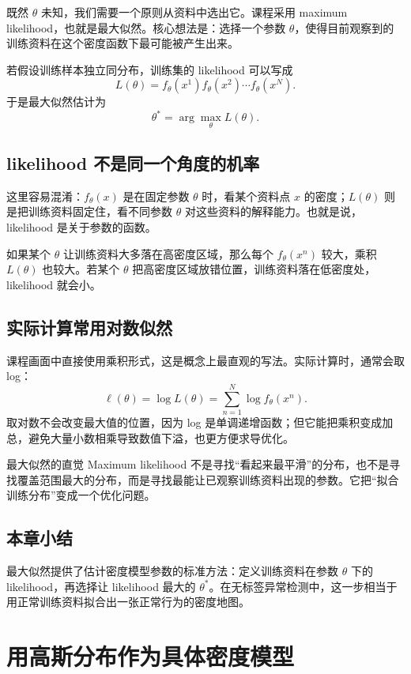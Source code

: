 \documentclass[a4paper]{article}
\begin{document}
既然 $\theta$ 未知，我们需要一个原则从资料中选出它。课程采用 maximum likelihood，也就是最大似然。核心想法是：选择一个参数 $\theta$，使得目前观察到的训练资料在这个密度函数下最可能被产生出来。

若假设训练样本独立同分布，训练集的 likelihood 可以写成
\[
L(\theta)=f_\theta(x^1)f_\theta(x^2)\cdots f_\theta(x^N).
\]
于是最大似然估计为
\[
\theta^\ast=\arg\max_\theta L(\theta).
\]

\subsection{likelihood 不是同一个角度的机率}

这里容易混淆：$f_\theta(x)$ 是在固定参数 $\theta$ 时，看某个资料点 $x$ 的密度；$L(\theta)$ 则是把训练资料固定住，看不同参数 $\theta$ 对这些资料的解释能力。也就是说，likelihood 是关于参数的函数。

如果某个 $\theta$ 让训练资料大多落在高密度区域，那么每个 $f_\theta(x^n)$ 较大，乘积 $L(\theta)$ 也较大。若某个 $\theta$ 把高密度区域放错位置，训练资料落在低密度处，likelihood 就会小。

\subsection{实际计算常用对数似然}

课程画面中直接使用乘积形式，这是概念上最直观的写法。实际计算时，通常会取 log：
\[
\ell(\theta)=\log L(\theta)=\sum_{n=1}^N \log f_\theta(x^n).
\]
取对数不会改变最大值的位置，因为 log 是单调递增函数；但它能把乘积变成加总，避免大量小数相乘导致数值下溢，也更方便求导优化。

\begin{knowledgebox}{最大似然的直觉}
    Maximum likelihood 不是寻找“看起来最平滑”的分布，也不是寻找覆盖范围最大的分布，而是寻找最能让已观察训练资料出现的参数。它把“拟合训练分布”变成一个优化问题。
\end{knowledgebox}

\subsection{本章小结}

最大似然提供了估计密度模型参数的标准方法：定义训练资料在参数 $\theta$ 下的 likelihood，再选择让 likelihood 最大的 $\theta^\ast$。在无标签异常检测中，这一步相当于用正常训练资料拟合出一张正常行为的密度地图。

\section{用高斯分布作为具体密度模型}
\end{document}

